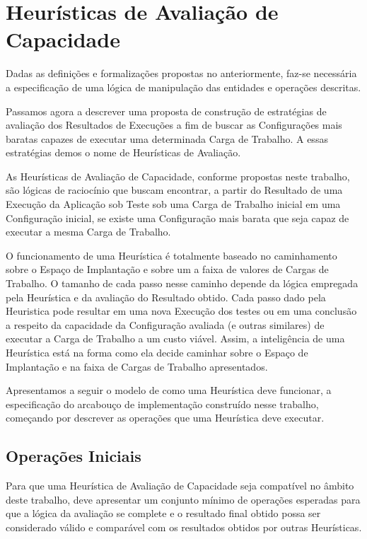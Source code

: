 \chapter[Heurísticas de Avaliação]{Heurísticas de Avaliação de Capacidade}
Dadas as definições e formalizações propostas no anteriormente, faz-se necessária
a especificação de uma lógica de manipulação das entidades e operações descritas.

Passamos agora a descrever uma proposta de construção de estratégias de avaliação
dos Resultados de Execuções a fim de buscar as Configurações mais baratas capazes
de executar uma determinada Carga de Trabalho. A essas estratégias demos o nome 
de Heurísticas de Avaliação. 

As Heurísticas de Avaliação de Capacidade, conforme propostas neste trabalho, são lógicas de
raciocínio que buscam encontrar, a partir do Resultado de uma Execução da 
Aplicação sob Teste sob uma Carga de Trabalho inicial em uma Configuração inicial, se 
existe uma Configuração mais barata que seja capaz de executar a mesma Carga de 
Trabalho.

O funcionamento de uma Heurística é totalmente baseado no caminhamento sobre o
Espaço de Implantação e sobre um a faixa de valores de Cargas de Trabalho. O 
tamanho de cada passo nesse caminho depende da lógica empregada pela Heurística 
e da avaliação do Resultado obtido. Cada passo dado pela Heuristica pode resultar 
em uma nova Execução dos testes ou em uma conclusão a respeito da capacidade da 
Configuração avaliada (e outras similares) de executar a Carga de Trabalho a um 
custo viável. Assim, a inteligência de uma Heurística está na forma como ela 
decide caminhar sobre o Espaço de Implantação e na faixa de Cargas de
Trabalho apresentados.

Apresentamos a seguir o modelo de como uma Heurística deve funcionar, a 
especificação do arcabouço de implementação construído nesse trabalho, começando
por descrever as operações que uma Heurística deve executar. 

\section{Operações Iniciais}
Para que uma Heurística de Avaliação de Capacidade seja compatível no âmbito deste trabalho, 
deve apresentar um conjunto mínimo de operações esperadas para que a lógica da
avaliação se complete e o resultado final obtido possa ser considerado válido e
comparável com os resultados obtidos por outras Heurísticas.


